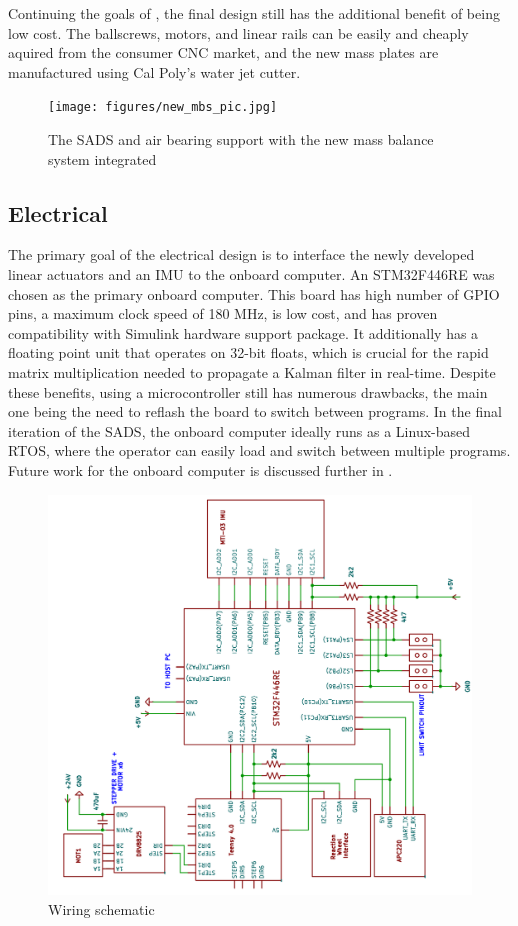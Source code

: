 Continuing the goals of \cite{gilman_automatic_2024}, the final design still has the additional benefit of being low cost. The ballscrews, motors, and linear rails can be easily and cheaply aquired from the consumer CNC market, and the new mass plates are manufactured using Cal Poly's water jet cutter.

\begin{figure}[h]
    \centering
    \texttt{[image: figures/new\_mbs\_pic.jpg]}
    \caption{The SADS and air bearing support with the new mass balance system integrated}
    \label{fig:new_mbs_pic}
\end{figure}

\subsection{Electrical}\label{sec:electrical}



The primary goal of the electrical design is to interface the newly developed linear actuators and an IMU to the onboard computer. An STM32F446RE was chosen as the primary onboard computer. This board has high number of GPIO pins, a maximum clock speed of 180 MHz, is low cost, and has proven compatibility with Simulink hardware support package. It additionally has a floating point unit that operates on 32-bit floats, which is crucial for the rapid matrix multiplication needed to propagate a Kalman filter in real-time. Despite these benefits, using a microcontroller still has numerous drawbacks, the main one being the need to reflash the board to switch between programs. In the final iteration of the SADS, the onboard computer ideally runs as a Linux-based RTOS, where the operator can easily load and switch between multiple programs. Future work for the onboard computer is discussed further in .

\begin{figure}[p]\label{fig:wiring}
    \centering
    \includegraphics[width=\linewidth,angle=-90]{figures/wiring.png}
    \caption{Wiring schematic}
\end{figure}

